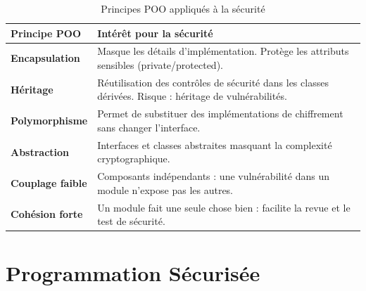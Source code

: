 \begin{table}[H]
\centering
\small
\begin{tabular}{p{3cm}p{8.5cm}}
    \toprule
    \textbf{Principe POO} & \textbf{Intérêt pour la sécurité} \\
    \midrule
    \textbf{Encapsulation}  & Masque les détails d'implémentation. Protège les attributs sensibles (private/protected). \\
    \textbf{Héritage}       & Réutilisation des contrôles de sécurité dans les classes dérivées. Risque : héritage de vulnérabilités. \\
    \textbf{Polymorphisme}  & Permet de substituer des implémentations de chiffrement sans changer l'interface. \\
    \textbf{Abstraction}    & Interfaces et classes abstraites masquant la complexité cryptographique. \\
    \textbf{Couplage faible} & Composants indépendants : une vulnérabilité dans un module n'expose pas les autres. \\
    \textbf{Cohésion forte} & Un module fait une seule chose bien : facilite la revue et le test de sécurité. \\
    \bottomrule
\end{tabular}
\caption{Principes POO appliqués à la sécurité}
\end{table}

\section{Programmation Sécurisée}

